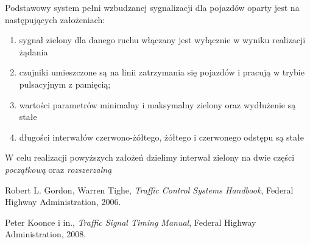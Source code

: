 \documentclass{pracamgr}
\begin{document}
Podstawowy system pełni wzbudzanej sygnalizacji dla pojazdów oparty
jest na następujących założeniach:
\begin{enumerate}
  \item sygnał zielony dla danego ruchu włączany jest wyłącznie w
  wyniku realizacji żądania
  \item czujniki umieszczone są na linii zatrzymania się pojazdów i
  pracują w trybie pulsacyjnym z pamięcią; 
  \item wartości parametrów minimalny i maksymalny zielony oraz
  wydłużenie są stałe
  \item długości interwałów czerwono-żółtego, żółtego i czerwonego
  odstępu są stałe
\end{enumerate}
W celu realizacji powyższych założeń dzielimy interwał zielony na dwie
części \emph{początkową} oraz \emph{rozszerzalną}

\begin{thebibliography}{99}

 Robert L. Gordon, Warren Tighe,
\textit{Traffic Control Systems Handbook}, Federal Highway
Administration, 2006.

 Peter Koonce i in., \textit{Traffic Signal
  Timing Manual}, Federal Highway Administration, 2008.

\end{thebibliography}
\end{document}
